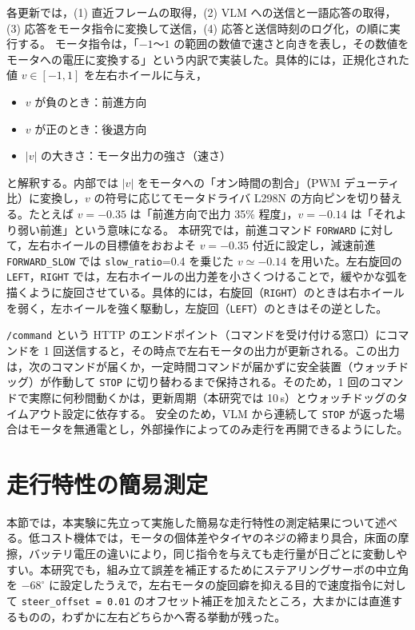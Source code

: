 \documentclass[a4paper,11pt]{ltjsreport}
\begin{document}
各更新では，(1) 直近フレームの取得，(2) VLM への送信と一語応答の取得，(3) 応答をモータ指令に変換して送信，(4) 応答と送信時刻のログ化，の順に実行する。
モータ指令は，「$-1$〜$1$ の範囲の数値で速さと向きを表し，その数値をモータへの電圧に変換する」という内訳で実装した。具体的には，正規化された値 $v \in [-1,1]$ を左右ホイールに与え，
\begin{itemize}
  \item $v$ が負のとき：前進方向
  \item $v$ が正のとき：後退方向
  \item $\lvert v\rvert$ の大きさ：モータ出力の強さ（速さ）
\end{itemize}
と解釈する。内部では $\lvert v\rvert$ をモータへの「オン時間の割合」（PWM デューティ比）に変換し，$v$ の符号に応じてモータドライバ L298N の方向ピンを切り替える。たとえば $v=-0.35$ は「前進方向で出力 35\% 程度」，$v=-0.14$ は「それより弱い前進」という意味になる。
本研究では，前進コマンド \texttt{FORWARD} に対して，左右ホイールの目標値をおおよそ $v=-0.35$ 付近に設定し，減速前進 \texttt{FORWARD\_SLOW} では \texttt{slow\_ratio}=0.4 を乗じた $v\simeq -0.14$ を用いた。左右旋回の \texttt{LEFT}，\texttt{RIGHT} では，左右ホイールの出力差を小さくつけることで，緩やかな弧を描くように旋回させている。具体的には，右旋回（\texttt{RIGHT}）のときは右ホイールを弱く，左ホイールを強く駆動し，左旋回（\texttt{LEFT}）のときはその逆とした。

\texttt{/command} という HTTP のエンドポイント（コマンドを受け付ける窓口）にコマンドを 1 回送信すると，その時点で左右モータの出力が更新される。この出力は，次のコマンドが届くか，一定時間コマンドが届かずに安全装置（ウォッチドッグ）が作動して \texttt{STOP} に切り替わるまで保持される。そのため，1 回のコマンドで実際に何秒間動くかは，更新周期（本研究では 10\,s）とウォッチドッグのタイムアウト設定に依存する。
安全のため，VLM から連続して \texttt{STOP} が返った場合はモータを無通電とし，外部操作によってのみ走行を再開できるようにした。

\section{走行特性の簡易測定}
本節では，本実験に先立って実施した簡易な走行特性の測定結果について述べる。低コスト機体では，モータの個体差やタイヤのネジの締まり具合，床面の摩擦，バッテリ電圧の違いにより，同じ指令を与えても走行量が日ごとに変動しやすい。本研究でも，組み立て誤差を補正するためにステアリングサーボの中立角を \(-68^\circ\) に設定したうえで，左右モータの旋回癖を抑える目的で速度指令に対して \texttt{steer\_offset = 0.01} のオフセット補正を加えたところ，大まかには直進するものの，わずかに左右どちらかへ寄る挙動が残った。
\end{document}
